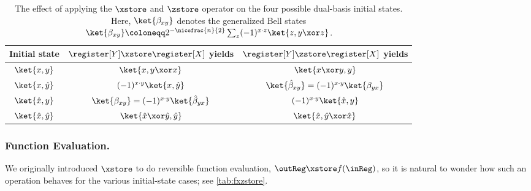     \begin{table}[h!]
      \caption{
        \label{tab:multixzstore}
        The effect of applying the $\xstore$ and $\zstore$ operator
        on the four possible dual-basis initial states.
        Here, $\ket{\beta_{xy}}$ denotes the generalized Bell states 
        $\ket{\beta_{xy}} \coloneqq 2^{-\nicefrac{n}{2}} \sum_z (-1)^{x \cdot z} \ket{z, y \xor z}$.
      }
      \centering
        \begin{tabular}{ccc}
          \toprule
          Initial state & $\register[Y] \xstore \register[X]$ yields & $\register[Y] \zstore \register[X]$ yields\\
          \midrule
          $\ket{x,y}$ & $\ket{x,y \xor x}$ & $\ket{x \xor y, y}$ \\
          $\ket{x,\hat y}$ & $(-1)^{x \cdot y}\ket{x, \hat y}$ & $\ket{\hat{\beta}_{xy}} = (-1)^{x \cdot y}\ket{\beta_{yx}}$ \\
          $\ket{\hat x, y}$ & $\ket{\beta_{xy}} = (-1)^{x \cdot y}\ket{\hat{\beta}_{yx}}$ & $(-1)^{x \cdot y}\ket{\hat x, y}$ \\
          $\ket{\hat x,\hat y}$ & $\ket{\hat x \xor \hat y, \hat y}$ & $\ket{\hat x, \hat y \xor \hat x}$ \\
          \bottomrule
        \end{tabular}
    \end{table}

  \subsubsection{Function Evaluation.}
    We originally introduced $\xstore$ to do reversible function evaluation,
    $\outReg \xstore f(\inReg)$, so it is natural to wonder how such an
    operation behaves for the various initial-state cases;
    see \cref{tab:fxzstore}.

